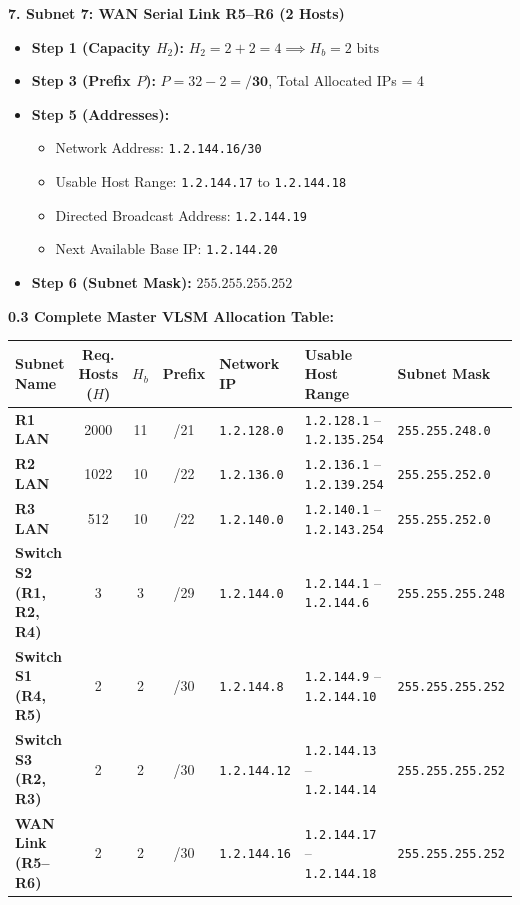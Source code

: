 \documentclass[11pt,a4paper]{article}
\begin{document}
\textbf{7. Subnet 7: WAN Serial Link R5--R6 (2 Hosts)}
\begin{itemize}
    \item \textbf{Step 1 (Capacity $H_2$):} $H_2 = 2 + 2 = 4 \implies H_b = 2\text{ bits}$
    \item \textbf{Step 3 (Prefix $P$):} $P = 32 - 2 = \mathbf{/30}$, Total Allocated IPs = 4
    \item \textbf{Step 5 (Addresses):}
    \begin{itemize}
        \item Network Address: \texttt{1.2.144.16/30}
        \item Usable Host Range: \texttt{1.2.144.17} to \texttt{1.2.144.18}
        \item Directed Broadcast Address: \texttt{1.2.144.19}
        \item Next Available Base IP: \texttt{1.2.144.20}
    \end{itemize}
    \item \textbf{Step 6 (Subnet Mask):} $\mathbf{255.255.255.252}$
\end{itemize}

\vspace{0.3cm}
\textbf{0.3 Complete Master VLSM Allocation Table:}

\begin{center}
\small
\setlength{\tabcolsep}{3.5pt}
\begin{tabular}{|l|c|c|c|l|l|l|}
\hline
\textbf{Subnet Name} & \textbf{Req. Hosts ($H$)} & \textbf{$H_b$} & \textbf{Prefix} & \textbf{Network IP} & \textbf{Usable Host Range} & \textbf{Subnet Mask} \\
\hline
\textbf{R1 LAN} & 2000 & 11 & /21 & \texttt{1.2.128.0} & \texttt{1.2.128.1} -- \texttt{1.2.135.254} & \texttt{255.255.248.0} \\
\textbf{R2 LAN} & 1022 & 10 & /22 & \texttt{1.2.136.0} & \texttt{1.2.136.1} -- \texttt{1.2.139.254} & \texttt{255.255.252.0} \\
\textbf{R3 LAN} & 512  & 10 & /22 & \texttt{1.2.140.0} & \texttt{1.2.140.1} -- \texttt{1.2.143.254} & \texttt{255.255.252.0} \\
\textbf{Switch S2 (R1, R2, R4)} & 3 & 3 & /29 & \texttt{1.2.144.0} & \texttt{1.2.144.1} -- \texttt{1.2.144.6} & \texttt{255.255.255.248} \\
\textbf{Switch S1 (R4, R5)}     & 2 & 2 & /30 & \texttt{1.2.144.8} & \texttt{1.2.144.9} -- \texttt{1.2.144.10} & \texttt{255.255.255.252} \\
\textbf{Switch S3 (R2, R3)}     & 2 & 2 & /30 & \texttt{1.2.144.12} & \texttt{1.2.144.13} -- \texttt{1.2.144.14} & \texttt{255.255.255.252} \\
\textbf{WAN Link (R5--R6)}      & 2 & 2 & /30 & \texttt{1.2.144.16} & \texttt{1.2.144.17} -- \texttt{1.2.144.18} & \texttt{255.255.255.252} \\
\hline
\end{tabular}
\end{center}
\end{document}
